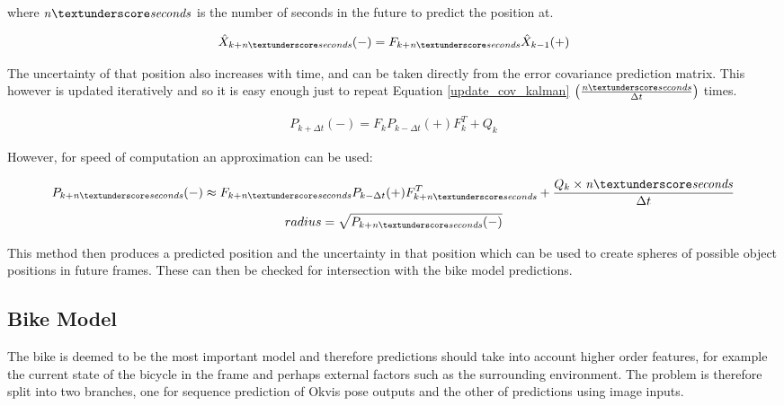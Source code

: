 \documentclass[11pt,twoside]{report}
\begin{document}
where $\mathit{n \textunderscore seconds}$ is the number of seconds in the future to predict the position at.

\begin{equation}
\begin{aligned}
\hat{X}_{k+\mathit{n \textunderscore seconds}}(-) =  F_{k+\mathit{n \textunderscore seconds}} \hat{X}_{k-1}(+)
\end{aligned}
\end{equation}

The uncertainty of that position also increases with time, and can be taken directly from the error covariance prediction matrix. This however is updated iteratively and so it is easy enough just to repeat Equation \ref{update_cov_kalman} $ \big (\frac{\mathit{n \textunderscore seconds}}{\Delta t} \big )$ times.

\begin{equation}
\begin{aligned}
P_{k+ \Delta t}(-) = F_{k} P_{k- \Delta t}(+) F_{k}^{T} + Q_{k}
\end{aligned}
\label{update_cov_kalman}
\end{equation}

However, for speed of computation an approximation can be used:

\begin{equation}
P_{k+ \mathit{n \textunderscore seconds}}(-) \approx F_{k + \mathit{n \textunderscore seconds}} P_{k- \Delta t}(+) F_{k + \mathit{n \textunderscore seconds}}^{T} + \frac{Q_{k} \times \mathit{n \textunderscore seconds}} {\Delta t}
\end{equation}
\begin{equation}
radius = \sqrt{P_{k+ \mathit{n \textunderscore seconds}}(-)}
\label{cov_kalman_approx}
\end{equation}

This method then produces a predicted position and the uncertainty in that position which can be used to create spheres of possible object positions in future frames. These can then be checked for intersection with the bike model predictions. 



\subsection{Bike Model} \label{bike_model}

The bike is deemed to be the most important model and therefore predictions should take into account higher order features, for example the current state of the bicycle in the frame and perhaps external factors such as the surrounding environment. The problem is therefore split into two branches, one for sequence prediction of Okvis pose outputs and the other of predictions using image inputs.
\end{document}
